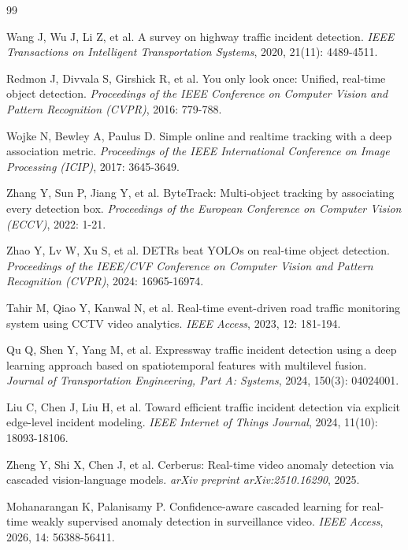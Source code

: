 \documentclass[10.5pt,a4paper,twoside,twocolumn]{ctexart}
\begin{document}
\begin{thebibliography}{99}

Wang J, Wu J, Li Z, et al.
A survey on highway traffic incident detection.
\emph{IEEE Transactions on Intelligent Transportation Systems}, 2020, 21(11): 4489-4511.

Redmon J, Divvala S, Girshick R, et al.
You only look once: Unified, real-time object detection.
\emph{Proceedings of the IEEE Conference on Computer Vision and Pattern Recognition (CVPR)}, 2016: 779-788.

Wojke N, Bewley A, Paulus D.
Simple online and realtime tracking with a deep association metric.
\emph{Proceedings of the IEEE International Conference on Image Processing (ICIP)}, 2017: 3645-3649.

Zhang Y, Sun P, Jiang Y, et al.
ByteTrack: Multi-object tracking by associating every detection box.
\emph{Proceedings of the European Conference on Computer Vision (ECCV)}, 2022: 1-21.

Zhao Y, Lv W, Xu S, et al.
DETRs beat YOLOs on real-time object detection.
\emph{Proceedings of the IEEE/CVF Conference on Computer Vision and Pattern Recognition (CVPR)}, 2024: 16965-16974.

Tahir M, Qiao Y, Kanwal N, et al.
Real-time event-driven road traffic monitoring system using CCTV video analytics.
\emph{IEEE Access}, 2023, 12: 181-194.

Qu Q, Shen Y, Yang M, et al.
Expressway traffic incident detection using a deep learning approach based on spatiotemporal features with multilevel fusion.
\emph{Journal of Transportation Engineering, Part A: Systems}, 2024, 150(3): 04024001.

Liu C, Chen J, Liu H, et al.
Toward efficient traffic incident detection via explicit edge-level incident modeling.
\emph{IEEE Internet of Things Journal}, 2024, 11(10): 18093-18106.

Zheng Y, Shi X, Chen J, et al.
Cerberus: Real-time video anomaly detection via cascaded vision-language models.
\emph{arXiv preprint arXiv:2510.16290}, 2025.

Mohanarangan K, Palanisamy P.
Confidence-aware cascaded learning for real-time weakly supervised anomaly detection in surveillance video.
\emph{IEEE Access}, 2026, 14: 56388-56411.


\end{thebibliography}
\end{document}

